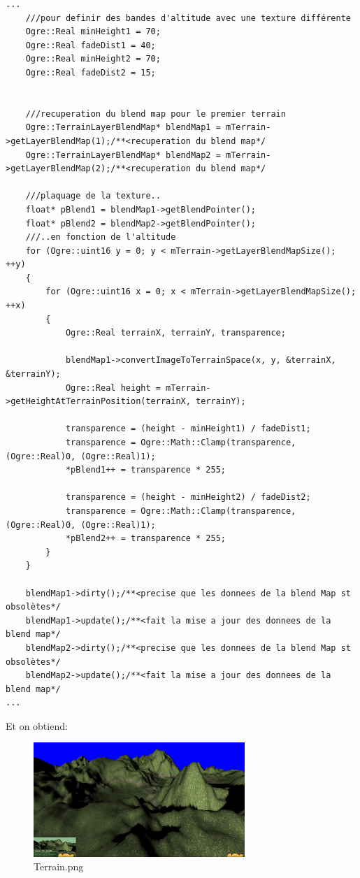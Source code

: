\begin{lstlisting}[caption={Plaquage de textures sur zone}]
...
    ///pour definir des bandes d'altitude avec une texture différente
    Ogre::Real minHeight1 = 70;
    Ogre::Real fadeDist1 = 40;
    Ogre::Real minHeight2 = 70;
    Ogre::Real fadeDist2 = 15;
    
    
    ///recuperation du blend map pour le premier terrain
    Ogre::TerrainLayerBlendMap* blendMap1 = mTerrain->getLayerBlendMap(1);/**<recuperation du blend map*/
    Ogre::TerrainLayerBlendMap* blendMap2 = mTerrain->getLayerBlendMap(2);/**<recuperation du blend map*/
    
    ///plaquage de la texture..
    float* pBlend1 = blendMap1->getBlendPointer();
    float* pBlend2 = blendMap2->getBlendPointer();
    ///..en fonction de l'altitude
    for (Ogre::uint16 y = 0; y < mTerrain->getLayerBlendMapSize(); ++y)
    {
        for (Ogre::uint16 x = 0; x < mTerrain->getLayerBlendMapSize(); ++x)
        {
            Ogre::Real terrainX, terrainY, transparence;
            
            blendMap1->convertImageToTerrainSpace(x, y, &terrainX, &terrainY);
            Ogre::Real height = mTerrain->getHeightAtTerrainPosition(terrainX, terrainY);
            
            transparence = (height - minHeight1) / fadeDist1;
            transparence = Ogre::Math::Clamp(transparence, (Ogre::Real)0, (Ogre::Real)1);
            *pBlend1++ = transparence * 255;
            
            transparence = (height - minHeight2) / fadeDist2;
            transparence = Ogre::Math::Clamp(transparence, (Ogre::Real)0, (Ogre::Real)1);
            *pBlend2++ = transparence * 255;
        }
    }
    
    blendMap1->dirty();/**<precise que les donnees de la blend Map st obsolètes*/
    blendMap1->update();/**<fait la mise a jour des donnees de la blend map*/
    blendMap2->dirty();/**<precise que les donnees de la blend Map st obsolètes*/
    blendMap2->update();/**<fait la mise a jour des donnees de la blend map*/ 
...
\end{lstlisting}



Et on obtiend:
\begin{figure}[hbtp]
\caption{Terrain.png}
\centering
\includegraphics[width=8cm]{Ogre/Base_de_Ogre/Garder_les_pieds_sur_terre/images/Differentes_textures_selon_altitude2.png} %
\end{figure}








